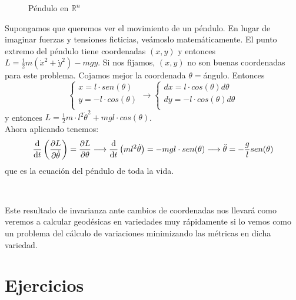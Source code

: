 \documentclass[palatino, bibnumbers]{apuntes}
\begin{document}
\begin{example}
	\begin{figure}
		\begin{center}
		\end{center}
		\caption{Péndulo en $ℝ^n$}
	\end{figure}
	
	Supongamos que queremos ver el movimiento de un péndulo. En lugar de imaginar fuerzas y tensiones ficticias, veámoslo matemáticamente. El punto extremo del péndulo tiene coordenadas $(x,y)$ y entonces $L=\frac{1}{2}m(\dot{x}^2+\dot{y}^2)-mgy$. Si nos fijamos, $(x,y)$ no son buenas coordenadas para este problema. Cojamos mejor la coordenada $\theta=$ángulo. Entonces$$ \begin{cases}
		x=l\cdot sen(\theta)\\
		y=-l\cdot cos(\theta)\\
	\end{cases}\longrightarrow \begin{cases}
	dx=l\cdot cos(\theta)d\theta\\
	dy=-l\cdot cos(\theta)d\theta\\
	\end{cases}$$
	y entonces $L=\frac{1}{2}m\cdot l^2\dot{\theta}^2+mgl\cdot cos(\theta)$. \\Ahora aplicando  tenemos:
	$$\dv{t}\left(\pdv{L}{\dot{\theta}}\right)=\pdv{L}{\theta}\longrightarrow\dv{t}\left(ml^2\dot{\theta}\right)=-mgl\cdot sen(\theta)\longrightarrow\ddot{\theta}=-\frac{g}{l}sen(\theta)$$
	que es la ecuación del péndulo de toda la vida.
\end{example}
\\
\begin{obs}
	Este resultado de invarianza ante cambios de coordenadas  nos llevará como veremos a calcular geodésicas en variedades muy rápidamente si lo vemos como un problema del cálculo de variaciones minimizando las métricas en dicha variedad.
	\end{obs}
\appendix

\chapter{Ejercicios}


\printindex
\end{document}
